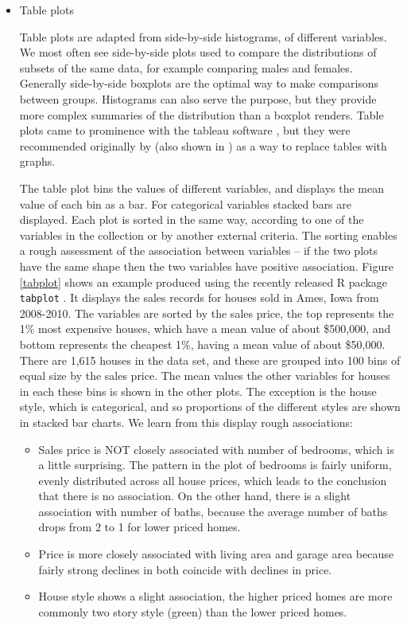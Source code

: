 \documentclass[11pt]{article}
\begin{document}
\begin{itemize}
\item Table plots

Table plots are adapted from side-by-side histograms, of different variables. We most often see side-by-side plots used to compare the distributions of subsets of the same data, for example comparing males and females. Generally side-by-side boxplots are the optimal way to make comparisons between groups. Histograms can also serve the purpose, but they provide more complex summaries of the distribution than a boxplot renders. Table plots came to prominence with the tableau software \citep{tableau}, but they were recommended originally by \citet{carr-grey} (also shown in \citet{carr-tabplot}) as a way to replace tables with graphs.

The table plot bins the values of different variables, and displays the mean value of each bin as a bar. For categorical variables stacked bars are displayed. Each plot is sorted in the same way, according to one of the variables in the collection or by another external criteria. The sorting enables a rough assessment of the association between variables -- if the two plots have the same shape then the two variables have positive association. Figure \ref{tabplot} shows an example produced using the recently released R package {\tt tabplot} \citep{tennekes2012package}. It displays the sales records for houses sold in Ames, Iowa from 2008-2010. The variables are sorted by the sales price, the top represents the 1\% most expensive houses, which have a mean value of about \$500,000, and bottom represents the cheapest 1\%, having a mean value of about \$50,000. There are 1,615 houses in the data set, and these are grouped into 100 bins of equal size by the sales price. The mean values the other variables for houses in each these bins is shown in the other plots. The exception is the house style, which is categorical, and so proportions of the different styles are shown in stacked bar charts. We learn from this display rough associations:

\begin{itemize} \itemsep 0in
\item Sales price is NOT closely associated with number of bedrooms, which is a little surprising. The pattern in the plot of bedrooms is fairly uniform, evenly distributed across all house prices, which leads to the conclusion that there is no association. On the other hand, there is a slight association with number of baths, because the average number of baths drops from 2 to 1 for lower priced homes.
\item Price is more closely associated with living area and garage area because fairly strong declines in both coincide with declines in price.
\item House style shows a slight association, the higher priced homes are more commonly two story style (green) than the lower priced homes.
\end{itemize}


\end{itemize}
\end{document}
